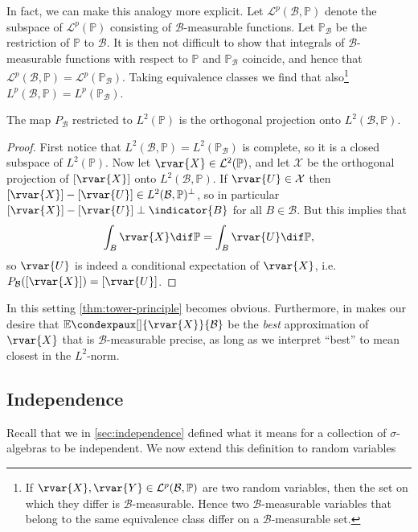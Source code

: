 \documentclass[article, a4paper, 11pt, oneside]{memoir}
\numberwithin{equation}{chapter}
\newcommand{\calB}{\mathcal{B}}
\newcommand{\calL}{\mathcal{L}}
\renewcommand{\P}{\mathbb{P}}
\newcommand{\condexp}[3][]{{\mathbb{E}\condexpaux[#1]{#2}{#3}}}
\begin{document}
In fact, we can make this analogy more explicit. Let $\calL^p(\calB,\P)$ denote the subspace of $\calL^p(\P)$ consisting of $\calB$-measurable functions. Let $\P_\calB$ be the restriction of $\P$ to $\calB$. It is then not difficult to show that integrals of $\calB$-measurable functions with respect to $\P$ and $\P_\calB$ coincide, and hence that $\calL^p(\calB,\P) = \calL^p(\P_\calB)$. Taking equivalence classes we find that also\footnote{If $\rvar{X},\rvar{Y} \in \calL^p(\calB,\P)$ are two random variables, then the set on which they differ is $\calB$-measurable. Hence two $\calB$-measurable variables that belong to the same equivalence class differ on a $\calB$-measurable set.} $L^p(\calB,\P) = L^p(\P_\calB)$.

\begin{proposition}
    The map $P_\calB$ restricted to $L^2(\P)$ is the orthogonal projection onto $L^2(\calB,\P)$.
\end{proposition}

\begin{proof}
    First notice that $L^2(\calB,\P) = L^2(\P_\calB)$ is complete, so it is a closed subspace of $L^2(\P)$. Now let $\rvar{X} \in \calL^2(\P)$, and let $\mathcal{X}$ be the orthogonal projection of $[\rvar{X}]$ onto $L^2(\calB,\P)$. If $\rvar{U} \in \mathcal{X}$ then $[\rvar{X}] - [\rvar{U}] \in L^2(\calB,\P)^\perp$, so in particular $[\rvar{X}] - [\rvar{U}] \perp \indicator{B}$ for all $B \in \calB$. But this implies that
    \begin{equation*}
        \int_B \rvar{X} \dif\P
            = \int_B \rvar{U} \dif\P,
    \end{equation*}
    so $\rvar{U}$ is indeed a conditional expectation of $\rvar{X}$, i.e. $P_\calB([\rvar{X}]) = [\rvar{U}]$.
\end{proof}
%
In this setting \cref{thm:tower-principle} becomes obvious. Furthermore, in makes our desire that $\condexp{\rvar{X}}{\calB}$ be the \emph{best} approximation of $\rvar{X}$ that is $\calB$-measurable precise, as long as we interpret \enquote{best} to mean closest in the $L^2$-norm.


\subsection{Independence}

Recall that we in \cref{sec:independence} defined what it means for a collection of $\sigma$-algebras to be independent. We now extend this definition to random variables
\end{document}
